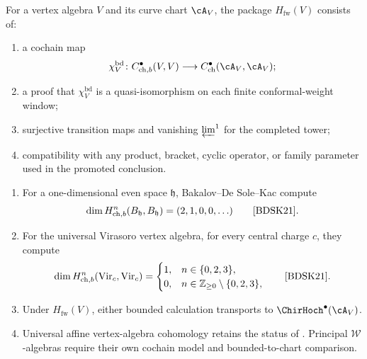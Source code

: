 \begin{definition}
\label{def:cct-finite-window-promotion}
For a vertex algebra \(V\) and its curve chart \(\cA_V\), the package
\(H_{\mathrm{fw}}(V)\) consists of:
\begin{enumerate}[label=\textup{(\roman*)}]
\item a cochain map
 \[
 \chi_V^{\mathrm{bd}}\colon
 C^\bullet_{\mathrm{ch},b}(V,V)
 \longrightarrow
 C^\bullet_{\mathrm{ch}}(\cA_V,\cA_V);
 \]
\item a proof that \(\chi_V^{\mathrm{bd}}\) is a quasi-isomorphism on
 each finite conformal-weight window;
\item surjective transition maps and vanishing \(\varprojlim^1\) for
 the completed tower;
\item compatibility with any product, bracket, cyclic operator, or
 family parameter used in the promoted conclusion.
\end{enumerate}
\end{definition}

\begin{proposition}
\label{prop:derived-center-explicit}
\begin{enumerate}[label=\textup{(\roman*)}]
\item For a one-dimensional even space \(\mathfrak h\),
Bakalov--De Sole--Kac compute
\[
 \dim H^n_{\mathrm{ch},b}(B_{\mathfrak h},B_{\mathfrak h})
 =(2,1,0,0,\ldots)
 \qquad\text{\cite[Theorem~7.4]{BDSK21}}.
\]
\item For the universal Virasoro vertex algebra, for every central
charge \(c\), they compute
\[
 \dim H^n_{\mathrm{ch},b}(\operatorname{Vir}_c,\operatorname{Vir}_c)
 =
 \begin{cases}
 1,&n\in\{0,2,3\},\\
 0,&n\in\mathbb Z_{\ge0}\setminus\{0,2,3\},
 \end{cases}
 \qquad\text{\cite[Theorem~7.2]{BDSK21}}.
\]
\item Under \(H_{\mathrm{fw}}(V)\), either bounded calculation
transports to
\(\ChirHoch^\bullet(\cA_V)\).
\item Universal affine vertex-algebra cohomology retains the status of
\cite[Conjecture~7.5]{BDSK21}.  Principal
\(\mathcal W\)-algebras require their own cochain model and
bounded-to-chart comparison.
\end{enumerate}
\end{proposition}

